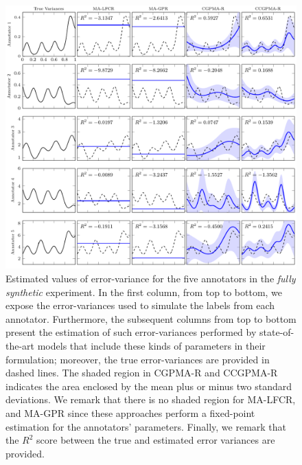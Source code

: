 \documentclass[journal]{IEEEtran}
\begin{document}
\begin{figure}[!tb]
	\centering
	\includegraphics[width = \textwidth]{Figures/VarEXp.pdf}
	\caption{Estimated values of error-variance for the five annotators in the \textit{fully synthetic} experiment. In the first column, from top to bottom, we expose the error-variances used to simulate the labels from each annotator. Furthermore, the subsequent columns from top to bottom present the estimation of such error-variances performed by state-of-the-art models that include these kinds of parameters in their formulation; moreover, the true error-variances are provided in dashed lines. The shaded region in CGPMA-R and CCGPMA-R indicates the area enclosed by the mean plus or minus two standard deviations. We remark that there is no shaded region for MA-LFCR, and MA-GPR since these approaches perform a fixed-point estimation for the annotators' parameters. Finally, we remark that the $R^2$ score between the true and estimated error variances are provided.}
	\label{fig:ExpReg}
\end{figure}
\end{document}
